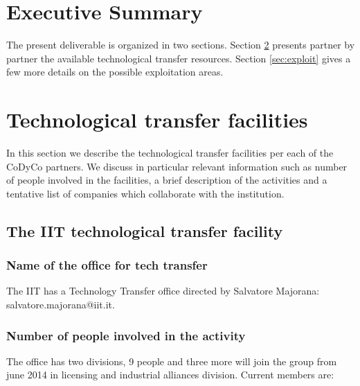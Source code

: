 \documentclass[12pt,a4paper,twoside]{article}
\begin{document}
\section{Executive Summary}
The present deliverable is organized in two sections. Section \ref{sec:tt} presents partner by partner the available technological transfer resources. Section \ref{sec:exploit} gives a few more details on the possible exploitation areas. 

\section{Technological transfer facilities} \label{sec:tt}
In this section we describe the technological transfer facilities per each of the CoDyCo partners. We discuss in particular relevant information such as number of people involved in the facilities, a brief description of the activities and a tentative list of companies which collaborate with the institution. 

\subsection{The IIT technological transfer facility}

\subsubsection{Name of the office for tech transfer}
The IIT has a Technology Transfer office directed by Salvatore Majorana: salvatore.majorana@iit.it.

\subsubsection{Number of people involved in the activity }
The office has two divisions, 9 people and three more will join the group from june 2014 in licensing and industrial alliances division. Current members are:
\end{document}

